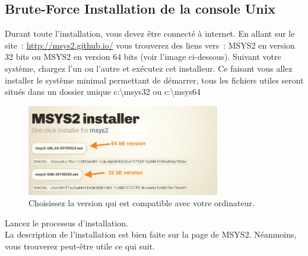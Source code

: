 \documentclass{article}
\begin{document}
\subsection{Brute-Force Installation de la console Unix \label{S:longInstallation}}
Durant toute l'installation, vous devez être connecté à internet. En allant sur le site : \href{http://msys2.github.io/}{http://msys2.github.io/} vous trouverez des liens vers : MSYS2 en version 32 bits ou MSYS2 en version 64 bits (voir l'image ci-dessous). Suivant votre système, chargez l'un ou l'autre et exécutez cet installeur. Ce faisant vous allez installer le système minimal permettant de démarrer, tous les fichiers utiles seront situés dans un dossier unique c:\textbackslash msys32 ou c:\textbackslash msys64
\begin{figure}[H]
\center
\includegraphics[width=0.75\textwidth]{Plots/Msys2_0.png}
\caption{Choisissez la version qui est compatible avec votre ordinateur.}
\end{figure}
Lancez le processus d'installation.\\
La description de l'installation est bien faite sur la page de MSYS2. Néanmoins, vous trouverez peut-être utile ce qui suit.
\end{document}
